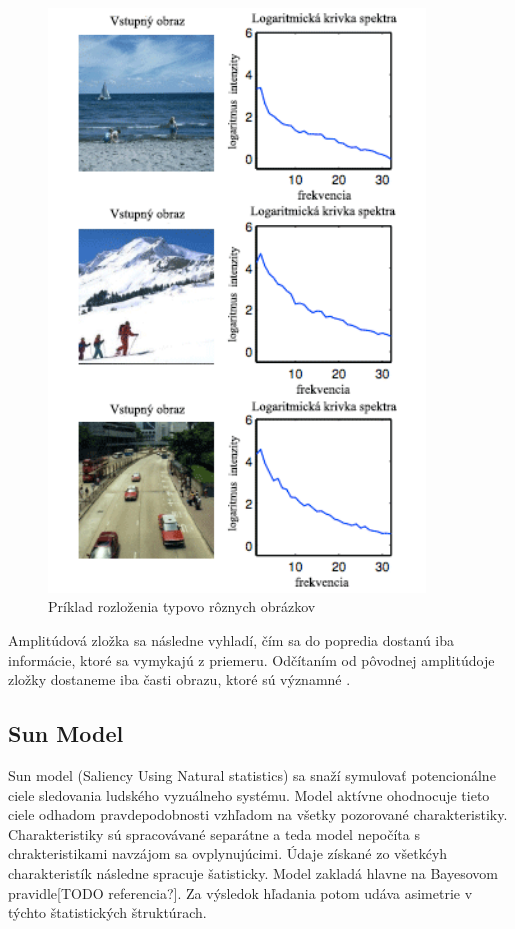 \begin{figure}[H]
  \centering
  \includegraphics[width=10cm]{pics/spectral-img.png}
  \caption{Príklad rozloženia typovo rôznych obrázkov\cite{spectral-rezidual}}\label{wrap-fig:2}
\end{figure}
\vspace{10mm}

Amplitúdová zložka sa následne vyhladí, čím sa do popredia dostanú iba informácie, ktoré sa vymykajú z priemeru.
Odčítaním od pôvodnej amplitúdoje zložky dostaneme iba časti obrazu, ktoré sú významné \cite{spectral-rezidual}.
\subsection{Sun Model}
Sun model (Saliency Using Natural statistics) sa snaží symulovať potencionálne ciele sledovania ludského vyzuálneho systému.
Model aktívne ohodnocuje tieto ciele odhadom pravdepodobnosti vzhľadom na všetky pozorované charakteristiky.
Charakteristiky sú spracovávané separátne a teda model nepočíta s chrakteristikami navzájom sa ovplynujúcimi.
Údaje získané zo všetkćyh charakteristík  následne spracuje šatisticky.
Model zakladá hlavne na Bayesovom pravidle[TODO referencia?].
Za výsledok hľadania potom udáva asimetrie v týchto štatistických štruktúrach\cite{sun-1}.
